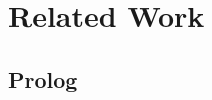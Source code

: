 \documentclass{jfp}
\begin{document}
%
\section{Related Work}
\label{sec:related-work}

\subsection{Prolog}
\end{document}
